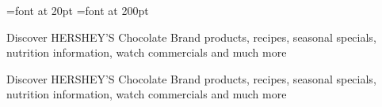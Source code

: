 \documentclass[a4paper]{report}
\begin{document}
\pagestyle{empty}
\tt %

\font\tiny=font at 20pt     %
\font\big=font at 200pt
\big  
\begin{flushleft}
\noindent



Discover HERSHEY'S Chocolate Brand products, recipes, seasonal \vspace{0.2}specials, nutrition information, watch commercials and much more

\tiny
Discover HERSHEY'S Chocolate Brand products, recipes, seasonal \vspace{0.2}specials, nutrition information, watch commercials and much more


\end{flushleft}
\end{document}
